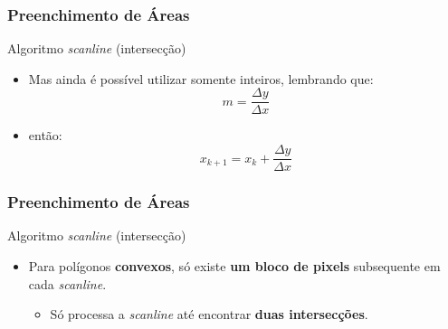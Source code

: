 \documentclass{beamer}
\begin{document}
\begin{frame}
\frametitle{Preenchimento de Áreas}

	\begin{block}{Algoritmo \textit{scanline} (intersecção)}
	\begin{itemize}
		\item Mas ainda é possível utilizar somente inteiros, lembrando que:
			\begin{equation*}
				m = \frac{\Delta y}{\Delta x} 
			\end{equation*}
		\item então:
				\begin{equation*}
					x_{k+1} = x_k +\frac{\Delta y}{\Delta x}
				\end{equation*}
	\end{itemize}
	\end{block}
	
\end{frame}


\begin{frame}
\frametitle{Preenchimento de Áreas}
	\begin{block}{Algoritmo \textit{scanline} (intersecção)}
	\begin{itemize}
		\item Para polígonos \textbf{convexos}, só existe \textbf{um bloco de pixels} subsequente em cada \textit{scanline}.
			\begin{itemize}
				\item Só processa a \textit{scanline} até encontrar \textbf{duas intersecções}.
			\end{itemize}
	\end{itemize}
	\end{block}
	
\end{frame}

\end{document}
